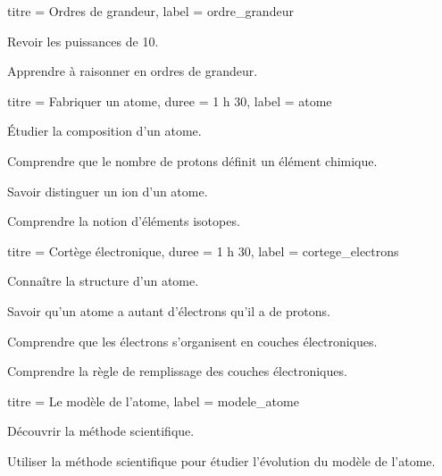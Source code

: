 \begin{multicols}{2}
  \setcounter{section}{0}
  \setcounter{activiteNum}{2}
  \begin{activite}{titre = Ordres de grandeur, label = ordre_grandeur}
    \begin{objectifs}  
      \item Revoir les puissances de 10.
      \item Apprendre à raisonner en ordres de grandeur.
    \end{objectifs}
  \end{activite}

  \vspace*{20pt}
  \setcounter{section}{5}
  \setcounter{activiteNum}{0}
  \begin{TP}{titre = Fabriquer un atome, duree = 1 h 30, label = atome}
    \begin{objectifs}
      \item Étudier la composition d'un atome.
      \item Comprendre que le nombre de protons définit un élément chimique.
      \item Savoir distinguer un ion d'un atome.
      \item Comprendre la notion d'éléments isotopes.
    \end{objectifs}
  \end{TP}

  \medskip
  \begin{activite}{titre = Cortège électronique, duree = 1 h 30, label = cortege_electrons}
    \begin{prerequis}
      \item Connaître la structure d'un atome.
      \item Savoir qu'un atome a autant d'électrons qu'il a de protons.
    \end{prerequis}
    \begin{objectifs}
      \item Comprendre que les électrons s'organisent en couches électroniques.
      \item Comprendre la règle de remplissage des couches électroniques.
    \end{objectifs}
  \end{activite}
  
  \begin{TP}{titre = Le modèle de l'atome, label = modele_atome}
    \begin{objectifs}
        \item Découvrir la méthode scientifique.
        \item Utiliser la méthode scientifique pour étudier l'évolution du modèle de l'atome.
    \end{objectifs}
  \end{TP}
  

\end{multicols}
